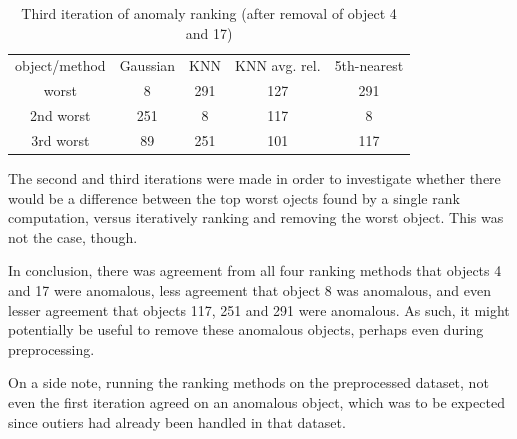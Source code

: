 \documentclass[a4paper,10pt]{article}
\begin{document}
\begin{table}[H]
\begin{tabular}{c | c c c c}
  object/method
        & Gaussian
                & KNN
                        & KNN avg. rel.
                          & 5th-nearest \\
  worst     & 8   & 291 & 127 & 291 \\
  2nd worst & 251 & 8   & 117 & 8   \\
  3rd worst & 89  & 251 & 101 & 117 
\end{tabular}
\caption{Third iteration of anomaly ranking (after removal of object 4 and 17)}
\label{table_ite3}
\end{table}

The second and third iterations were made in order to investigate whether there would be a difference between the top worst ojects found by a single rank computation, versus iteratively ranking and removing the worst object. This was not the case, though.

In conclusion, there was agreement from all four ranking methods that objects 4 and 17 were anomalous, less agreement that object 8 was anomalous, and even lesser agreement that objects 117, 251 and 291 were anomalous. As such, it might potentially be useful to remove these anomalous objects, perhaps even during preprocessing.

On a side note, running the ranking methods on the preprocessed dataset, not even the first iteration agreed on an anomalous object, which was to be expected since outiers had already been handled in that dataset.
\end{document}
